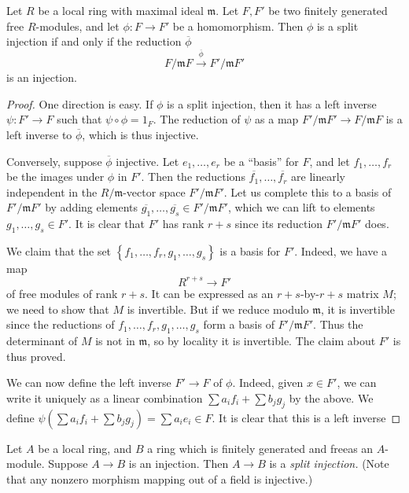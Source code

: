 \begin{proposition} 
Let $R$ be a local ring with maximal ideal $\mathfrak{m}$. Let $F, F'$ be two
finitely generated free $R$-modules, and let $\phi: F \to F'$ be a homomorphism. 
Then $\phi$ is a split injection if and only if the reduction $\overline{\phi}$
\[ F/\mathfrak{m}F \stackrel{\overline{\phi}}{\to} F'/\mathfrak{m}F'  \]
is an injection. 
\end{proposition}
\begin{proof} 
One direction is easy. If $\phi$ is a split injection, then it has a left
inverse
$\psi: F' \to F$ such that $\psi \circ \phi = 1_F$. The reduction of $\psi$ as a
map $F'/\mathfrak{m}F' \to F/\mathfrak{m}F$ is a left inverse to
$\overline{\phi}$, which is thus injective.

Conversely, suppose $\overline{\phi}$ injective. Let $e_1, \dots, e_r$ be a
``basis'' for $F$, and let $f_1, \dots, f_r$ be the images under $\phi$ in
$F'$. Then the reductions $\overline{f_1}, \dots, \overline{f_r}$ are linearly
independent in the $R/\mathfrak{m}$-vector space $F'/\mathfrak{m}F'$. Let us
complete this to a basis of $F'/\mathfrak{m}F'$ by adding elements
$\overline{g_1}, \dots, \overline{g_s} \in F'/\mathfrak{m}F'$, which we can
lift to elements $g_1, \dots, g_s \in F'$. It is clear that $F'$ has rank $r+s $
since its reduction $F'/\mathfrak{m}F'$ does.

We claim that the set $\left\{f_1, \dots, f_r, g_1, \dots, g_s\right\}$ is a
basis for $F'$. Indeed, we have a map 
\[ R^{r+s} \to F'  \]
of free modules of rank $r+s$. It can be expressed as an $r+s$-by-$r+s$ matrix
$M$; we need to show that $M$ is invertible. But if we reduce modulo
$\mathfrak{m}$, it is invertible since the reductions of $f_1, \dots, f_r,
g_1, \dots, g_s$ form a basis of $F'/\mathfrak{m}F'$. 
Thus the determinant of $M$ is not in $\mathfrak{m}$, so by locality it is
invertible. 
The claim about $F'$ is thus proved.

We can now define the left inverse $F' \to F$ of $\phi$. Indeed, given $x \in F'$,
we can write it uniquely as a linear combination $\sum a_i f_i + \sum b_j g_j$
by the above. We define $\psi(\sum a_i f_i + \sum b_j g_j) = \sum a_i e_i \in
F$. It is clear that this is a left inverse
\end{proof} 

\begin{exercise} 
Let $A$ be a local ring, and $B$ a ring which is finitely generated and freeas an
$A$-module. Suppose $A \to B$ is an injection. Then $A \to B$ is a \emph{split
injection.} (Note that any nonzero morphism mapping out of a field is
injective.) 
\end{exercise} 

